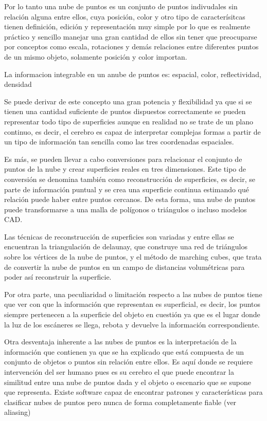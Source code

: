 Por lo tanto una nube de puntos es un conjunto de puntos indivudales sin relación alguna entre ellos, cuya
posición, color y otro tipo de caracterísitcas tienen definición, edición y representación muy simple por lo
que es realmente práctico y sencillo manejar una gran cantidad de ellos sin tener que preocuparse por
conceptos como escala, rotaciones y demás relaciones entre diferentes puntos de un mismo objeto,
solamente posición y color importan.

La informacion integrable en un anube de puntos es:
espacial, color, reflectividad, densidad


Se puede derivar de este concepto una gran potencia y flexibilidad ya que si se tienen una cantidad
suficiente de puntos dispuestos correctamente se pueden representar todo tipo de superficies aunque en
realidad no se trate de un plano continuo, es decir, el cerebro es capaz de interpretar complejas formas a
partir de un tipo de información tan sencilla como las tres coordenadas espaciales.

Es más, se pueden llevar a cabo conversiones para relacionar el conjunto de puntos de la nube y crear
superficies reales en tres dimensiones. Este tipo de conversión se denomina también como reconstrucción de superficies, es decir, se parte de información puntual y se crea una superficie continua estimando qué
relación puede haber entre puntos cercanos. De esta forma, una nube de puntos puede transformarse a una
malla de polígonos o triángulos o incluso modelos CAD.

Las técnicas de reconstrucción de superficies son variadas y entre ellas se encuentran la triangulación de
delaunay, que construye una red de triángulos sobre los vértices de la nube de puntos, y el método de
marching cubes, que trata de convertir la nube de puntos en un campo de distancias volumétricas para
poder así reconstruir la superficie.


Por otra parte, una peculiaridad o limitación respecto a las nubes de puntos tiene que ver con que la
información que representan es superficial, es decir, los puntos siempre pertenecen a la superficie del
objeto en cuestión ya que es el lugar donde la luz de los escáneres se llega, rebota y devuelve la
información correspondiente.

Otra desventaja inherente a las nubes de puntos es la interpretación de la información que contienen ya
que se ha explicado que está compuesta de un conjunto de objetos o puntos sin relación entre ellos. Es
aquí donde se requiere intervención del ser humano pues es su cerebro el que puede encontrar la similitud
entre una nube de puntos dada y el objeto o escenario que se supone que representa. Existe software capaz
de encontrar patrones y características para clasificar nubes de puntos pero nunca de forma
completamente fiable (ver aliasing)

